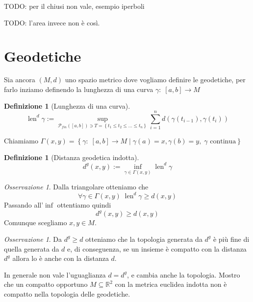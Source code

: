 \documentclass[a4paper,10pt]{article}
\newcounter{counter1}
\theoremstyle{plain}
\theoremstyle{definition}
\newtheorem{mydef}[counter1]{Definizione}
\theoremstyle{remark}
\newtheorem{myoss}[counter1]{Osservazione}
\newcommand{\set}[1]{\left\{#1\right\}}
\newcommand{\pa}[1]{\left(#1\right)}
\newcommand{\bra}[1]{\left[#1\right]}
\DeclareMathOperator{\len}{len}
\begin{document}
TODO: per il chiusi non vale, esempio iperboli

TODO: l'area invece non è così.

\section{Geodetiche}

Sia ancora $(M,d)$ uno spazio metrico dove vogliamo definire le
geodetiche, per farlo inziamo definendo la lunghezza di una curva
$\gamma :\; \bra{a,b} \to M$
\begin{mydef}[Lunghezza di una curva]
  \[ \len^d \gamma := \sup _{\mathcal{P}_{fin}(\bra{a,b}) \ni T =
    \set{t_1 \le t_2 \le ... \le t_n}} \sum_{i=1}^n d\pa{
    \gamma\pa{t_{i-1}}, \gamma\pa{t_i}} \]
\end{mydef}

Chiamiamo $\Gamma (x,y) = \set{\gamma:\; \bra{a,b} \to M \mid
  \gamma(a) = x, \gamma(b) = y,\; \gamma \text{ continua}}$

\begin{mydef}[Distanza geodetica indotta]
  \[ d^g (x,y) := \inf _{\gamma \in \Gamma(x,y)} \len^d \gamma \]
\end{mydef}

\begin{myoss}
  Dalla triangolare otteniamo che 
  \[ \forall \gamma \in \Gamma(x,y) \; \len^d \gamma \ge d(x,y) \]
  Passando all'$\inf$ ottentiamo quindi
  \[ d^g(x,y) \ge d(x,y) \]
  Comunque scegliamo $x,y \in M$.
\end{myoss}

\begin{myoss}
\label{oss:topologiagedoeticafine}
  Da $d^g \ge d$ otteniamo che la topologia generata da $d^g$ è più
  fine di quella generata da $d$ e, di conseguenza, se un insieme è
  compatto con la distanza $d^g$ allora lo è anche con la distanza
  $d$.
\end{myoss}

In generale non vale l'uguaglianza $d = d^g$, e cambia anche la
topologia. Mostro che un compatto opportuno $M \subseteq \mathbb{R}^2$
con la metrica euclidea indotta non è compatto nella topologia delle
geodetiche.
\end{document}
